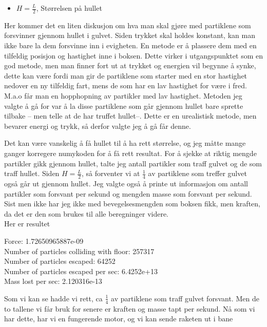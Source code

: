 \documentclass[a4paper,norsk,11pt,twoside]{article}
\begin{document}
\begin{itemize}
\item $H = \frac{L}{2}$, Størrelsen på hullet
\end{itemize}

Her kommer det en liten diskusjon om hva man skal gjøre med partiklene som forsvinner gjennom hullet i gulvet. Siden trykket skal holdes konstant, kan man ikke bare la dem forsvinne inn i evigheten. En metode er å plassere dem med en tilfeldig posisjon og hastighet inne i boksen. Dette virker i utgangspunktet som en god metode, men man finner fort ut at trykket og energien vil begynne å synke, dette kan være fordi man gir de partiklene som starter med en stor hastighet nedover en ny tilfeldig fart, mens de som har en lav hastighet for være i fred. M.a.o får man en hopphopning av partikler med lav hastighet. Metoden jeg valgte å gå for var å la disse partiklene som går gjennom hullet bare sprette tilbake -- men telle at de har truffet hullet--. Dette er en urealistisk metode, men bevarer energi og trykk, så derfor valgte jeg å gå får denne.

Det kan være vanskelig å få hullet til å ha rett størrelse, og jeg måtte mange ganger korregere numykoden for å få rett resultat. For å sjekke at riktig mengde partikler gikk gjennom hullet, talte jeg antall partikler som traff gulvet og de som traff hullet. Siden $H = \frac{L}{2}$, så forventer vi at $\frac{1}{4}$ av partiklene som treffer gulvet også går ut gjennom hullet. Jeg valgte også å printe ut informasjon om antall partikler som forsvant per sekund og mengden masse som forsvant per sekund.\\

Sist men ikke har jeg ikke med bevegelsesmengden som boksen fikk, men kraften, da det er den som brukes til alle beregninger videre. \\

Her er resultet


\begin{tcolorbox}
Force:  1.72650965887e-09 \\
Number of particles colliding with floor:  257317 \\
Number of particles escaped:  64252 \\
Number of particles escaped per sec:  6.4252e+13 \\
Mass lost per sec:  2.120316e-13
\end{tcolorbox}

Som vi kan se hadde vi rett, ca $\frac{1}{4}$ av partiklene som traff gulvet forsvant. Men de to tallene vi får bruk for senere er kraften og masse tapt per sekund. Nå som vi har dette, har vi en fungerende motor, og vi kan sende raketen ut i bane
\end{document}
